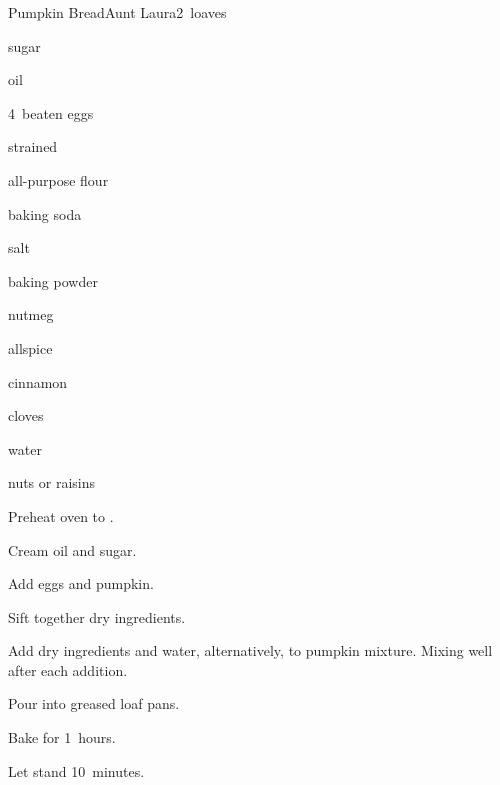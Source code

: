 \begin{recipe}{Pumpkin Bread}{Aunt Laura}{2~loaves}

\begin{ingredients}
\item {} sugar
\item {} oil
\item 4~beaten eggs
\item {} strained 
\item \C{3\half} all-purpose flour
\item {} baking soda
\item {} salt
\item {} baking powder
\item {} nutmeg
\item {} allspice
\item {} cinnamon
\item \tp{\half} cloves
\item \C{\twothird} water
\item \C{\half} nuts or raisins
\end{ingredients}

\begin{directions}
\item Preheat oven to .
\item Cream oil and sugar.
\item Add eggs and pumpkin.
\item Sift together dry ingredients.
\item Add dry ingredients and water, alternatively, to pumpkin mixture. Mixing well after each addition.
\item Pour into greased loaf pans.
\item Bake for 1\half~hours.
\item Let stand 10~minutes.
\end{directions}

\end{recipe}
